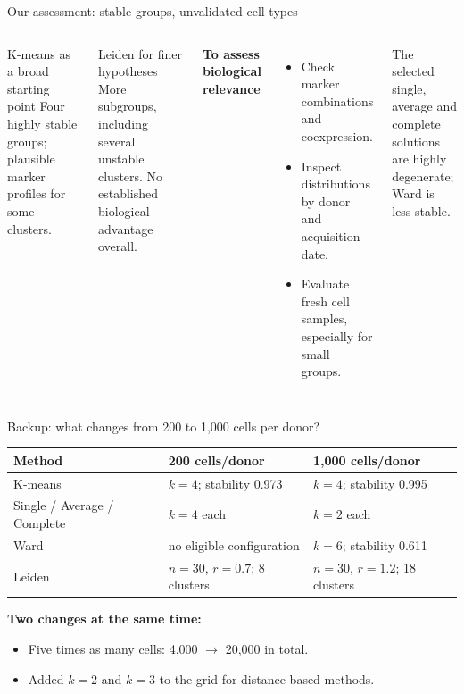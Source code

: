 \begin{frame}{Our assessment: stable groups, unvalidated cell types}
  \begin{columns}[T,onlytextwidth]
    \begin{block}{K-means as a broad starting point}
      Four highly stable groups; plausible marker profiles for some clusters.
    \end{block}
    \begin{block}{Leiden for finer hypotheses}
      More subgroups, including several unstable clusters. No established biological advantage overall.
    \end{block}
    \textbf{To assess biological relevance}
    \small
    \begin{itemize}
      \item Check marker combinations and coexpression.
      \item Inspect distributions by donor and acquisition date.
      \item Evaluate fresh cell samples, especially for small groups.
    \end{itemize}
    \vspace{2mm}
    The selected single, average and complete solutions are highly degenerate; Ward is less stable.
  \end{columns}
\end{frame}

\appendix
\begin{frame}{Backup: what changes from 200 to 1,000 cells per donor?}
  \small
  \renewcommand{\arraystretch}{1.3}
  \begin{tabular}{@{}lll@{}}
    \toprule
    Method & 200 cells/donor & 1,000 cells/donor\\
    \midrule
    K-means & $k=4$; stability 0.973 & $k=4$; stability 0.995\\
    Single / Average / Complete & $k=4$ each & $k=2$ each\\
    Ward & no eligible configuration & $k=6$; stability 0.611\\
    Leiden & $n=30$, $r=0.7$; 8 clusters & $n=30$, $r=1.2$; 18 clusters\\
    \bottomrule
  \end{tabular}\par
  \vspace{5mm}
  \textbf{Two changes at the same time:}
  \begin{itemize}
    \item Five times as many cells: 4,000 $\rightarrow$ 20,000 in total.
    \item Added $k=2$ and $k=3$ to the grid for distance-based methods.
  \end{itemize}
\end{frame}

